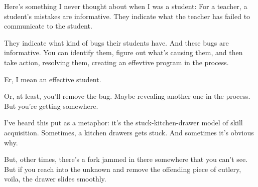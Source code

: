 Here's something I never thought about when I was a student: For a teacher, a
student's mistakes are informative. They indicate what the teacher has failed to
communicate to the student.

They indicate what kind of bugs their students have. And these bugs are
informative. You can identify them, figure out what's causing them, and then
take action, resolving them, creating an effevtive program in the process.

Er, I mean an effective student.

Or, at least, you'll remove the bug. Maybe revealing another one in the
process. But you're getting somewhere.

I've heard this put as a metaphor: it's the stuck-kitchen-drawer model of skill
acquisition. Sometimes, a kitchen drawers gets stuck. And sometimes it's obvious
why.

But, other times, there's a fork jammed in there somewhere that you can't
see. But if you reach into the unknown and remove the offending piece of
cutlery, voila, the drawer slides smoothly.
